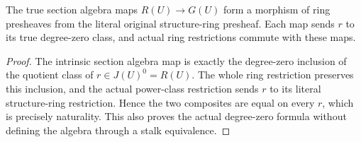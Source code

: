\begin{lemma}
\label{hir:real-domain-actual-normal-associated-section-ambient-ring-map}
\leanok
The true section algebra maps $R(U)\to G(U)$ form a morphism of ring
presheaves from the literal original structure-ring presheaf. Each map
sends $r$ to its true degree-zero class, and actual ring restrictions
commute with these maps.
\end{lemma}
\begin{proof}
The intrinsic section algebra map is exactly the degree-zero inclusion
of the quotient class of $r\in J(U)^0=R(U)$. The whole ring restriction
preserves this inclusion, and the actual power-class restriction sends
$r$ to its literal structure-ring restriction. Hence the two composites
are equal on every $r$, which is precisely naturality. This also proves
the actual degree-zero formula without defining the algebra through a
stalk equivalence.
\end{proof}

